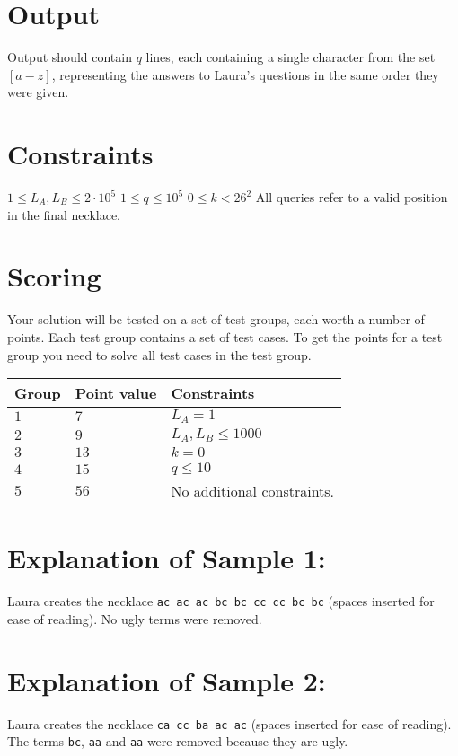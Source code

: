 \section*{Output}
Output should contain $q$ lines, each containing a single character from the set $[a-z]$, representing the answers to Laura's questions in the same order they were given.

\section*{Constraints}
$1 \le L_A, L_B \le 2\cdot 10^5$
\newline
$1 \le q \le  10^5$
\newline
$0 \le k < 26^2$
\newline
All queries refer to a valid position in the final necklace.

\section*{Scoring}
Your solution will be tested on a set of test groups, each worth a number of points. 
Each test group contains a set of test cases. 
To get the points for a test group you need to solve all test cases in the test group.

\noindent
\begin{tabular}{| l | l | p{12cm} |}
  \hline
  \textbf{Group} & \textbf{Point value} & \textbf{Constraints} \\ \hline
  $1$    & $7$        & $L_A = 1$  \\ \hline
  $2$    & $9$        & $L_A, L_B \le 1000$ \\ \hline
  $3$    & $13$       & $k = 0$ \\ \hline
  $4$    & $15$       & $q \le 10$ \\ \hline 
  $5$    & $56$       & No additional constraints. \\ \hline
\end{tabular}

\section*{Explanation of Sample 1:}
Laura creates the necklace \texttt{ac ac ac bc bc cc cc bc bc} (spaces inserted for ease of reading).
No ugly terms were removed.

\section*{Explanation of Sample 2:}
Laura creates the necklace \texttt{ca cc ba ac ac} (spaces inserted for ease of reading).
The terms \texttt{bc}, \texttt{aa} and \texttt{aa} were removed because they are ugly.
